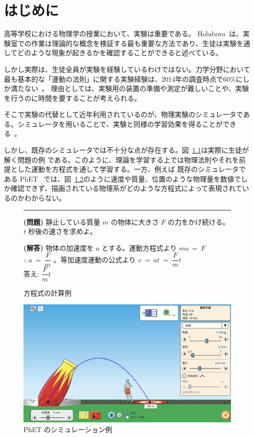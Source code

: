 \chapter{はじめに} \label{intro}

高等学校における物理学の授業において、実験は重要である。
Holubova~\cite{holubova_2019}は、実験室での作業は理論的な概念を検証する最も重要な方法であり、生徒は実験を通してどのような現象が起きるかを確認することができると述べている。

しかし実際は、生徒全員が実験を経験しているわけではない。力学分野において最も基本的な「運動の法則」に関する実験経験は、2014年の調査時点で60\%にしか満たない~\cite{2015KJ00010038066}。
理由としては、実験用の装置の準備や測定が難しいことや、実験を行うのに時間を要することが考えられる。

そこで実験の代替として近年利用されているのが、物理実験のシミュレータである。シミュレータを用いることで、実験と同様の学習効果を得ることができる~\cite{ajredini_real_2014}。

しかし、既存のシミュレータでは不十分な点が存在する。図~\ref{symbol_based}は実際に生徒が解く問題の例
である。このように、理論を学習する上では物理法則やそれを前提とした運動を方程式を通して学習する。一方、例えば
既存のシミュレータである
PhET~\cite{perkins_phet_2006} では、図~\ref{numeral_based}のように速度や質量、位置のような物理量を数値でしか確認できず、描画されている物理系がどのような方程式によって表現されているのかわからない。

\begin{figure}[b]
\noindent\rule{\linewidth}{0.4pt}

\small{\textbf{(問題)} 静止している質量 $m$ の物体に大きさ $F$ の力をかけ続ける。$t$ 秒後の速さを求めよ。}

\small{\textbf{(解答)} 物体の加速度を $a$ とする。運動方程式より $ma~=~F$ $\therefore~a~=~\dfrac{F}{m}$ 。等加速度運動の公式より $v~=~at~=~\dfrac{F}{m}t$\\
答え: $\dfrac{F}{m}t$}

\caption{方程式の計算例} \label{symbol_based}
\end{figure}

\begin{figure}[thb]
\centering
\includegraphics*[width=0.9\linewidth]{figure/PhET_example.png}
\caption{PhET のシミュレーション例} \label{numeral_based}
\end{figure}

